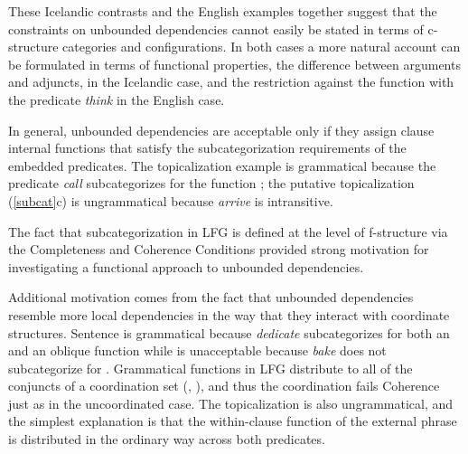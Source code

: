 \documentclass[output=paper,hidelinks]{langscibook}
\begin{document}
These Icelandic contrasts and the English examples  together suggest that the constraints on unbounded dependencies cannot easily be stated in terms of c-structure categories and configurations.  In both cases a more natural account can be formulated in terms of functional properties, the difference between arguments and adjuncts, in the Icelandic case, and the restriction against the \COMP function with the predicate \textit{think} in the English case.

In general, unbounded dependencies are acceptable only if they assign clause internal functions that satisfy the subcategorization requirements of the embedded predicates.  The topicalization example  is grammatical because the predicate \textit{call} subcategorizes for the function \OBJ; the putative topicalization (\ref{subcat}c) is ungrammatical because \textit{arrive} is intransitive.

\ea\label{subcat}
\z\z

\noindent  The fact that subcategorization in LFG is defined at the level of f-structure via the Completeness and Coherence Conditions provided strong motivation for investigating a functional approach to unbounded dependencies.   

Additional motivation comes from the fact that unbounded dependencies resemble more local dependencies in the way that they interact with coordinate structures.  Sentence  is grammatical because \textit{dedicate} subcategorizes for both an \OBJ and an oblique function \OBLTHETA while  is unacceptable because \textit{bake} does not subcategorize for \OBLTHETA.  Grammatical functions in LFG distribute to all of the conjuncts of a coordination set (\citealt{bresnan-etal1985,KaplanMaxwell1988:Coord,DalrympleKaplan2000}, ), and thus the coordination  fails Coherence just as in the uncoordinated case.  The topicalization  is also ungrammatical, and the simplest explanation is that the within-clause function of the external phrase is distributed in the ordinary way across both predicates.

\ea\label{coordination}
\label{coorda} 
\label{coordx} 
\label{coordb}
\label{coordc} 
\z\z
\end{document}
